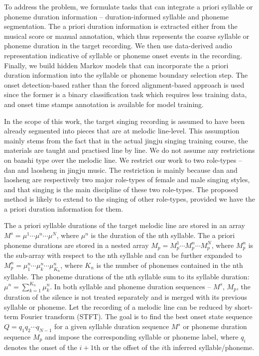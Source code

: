 To address the problem, we formulate tasks that can integrate a priori syllable or phoneme duration information -- duration-informed syllable and phoneme segmentation. The a priori duration information is extracted either from the musical score or manual annotation, which thus represents the coarse syllable or phoneme duration in the target recording. We then use data-derived audio representation indicative of syllable or phoneme onset events in the recording. Finally, we build hidden Markov models that can incorporate the a priori duration information into the syllable or phoneme boundary selection step. The onset detection-based rather than the forced alignment-based approach is used since the former is a binary classification task which requires less training data, and onset time stamps annotation is available for model training.

In the scope of this work, the target singing recording is assumed to have been already segmented into pieces that are at melodic line-level. This assumption mainly stems from the fact that in the actual jingju singing training course, the materials are taught and practised line by line. We do not assume any restrictions on \gls{banshi} type over the melodic line. We restrict our work to two role-types -- \gls{dan} and \gls{laosheng} in jingju music. The restriction is mainly because \gls{dan} and \gls{laosheng} are respectively two major role-types of female and male singing styles, and that singing is the main discipline of these two role-types. The proposed method is likely to extend to the singing of other role-types, provided we have the a priori duration information for them. 

The a priori syllable durations of the target melodic line are stored in an array $M^s=\mu^{1} \cdots \mu^{n} \cdots \mu^{N}$, where $\mu^{n}$ is the duration of the nth syllable. The a priori phoneme durations are stored in a nested array $M_p=M^{1}_p \cdots M^{n}_p \cdots M^{N}_p$, where $M^{n}_p$ is the sub-array with respect to the nth syllable and can be further expanded to $M^{n}_p=\mu_{1}^{n} \cdots \mu_{k}^{n} \cdots \mu_{K_{n}}^{n}$, where $K_{n}$ is the number of phonemes contained in the nth syllable. The phoneme durations of the nth syllable sum to its syllable duration: $\mu^{n}=\sum_{k=1}^{K_{n}} \mu_k^{n}$. In both syllable and phoneme duration sequences -- $M^s$, $M_p$, the duration of the silence is not treated separately and is merged with its previous syllable or phoneme. Let the recording of a melodic line can be reduced by short-term Fourier transform (STFT). The goal is to find the best onset state sequence $Q={q_1 q_2 \cdots q_{N-1}}$ for a given syllable duration sequence $M^s$ or phoneme duration sequence $M_p$ and impose the corresponding syllable or phoneme label, where $q_i$ denotes the onset of the $i+1$th or the offset of the $i$th inferred syllable/phoneme.

